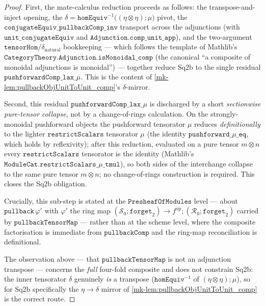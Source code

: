 \begin{proof}
  First, the mate-calculus reduction proceeds as follows: the transpose-and-inject
  opening, the \(\delta = \mathtt{homEquiv}^{-1}\bigl((\eta\otimes\eta)\mathbin{;}\mu\bigr)\)
  pivot, the \(\mathtt{conjugateEquiv\_pullbackComp\_inv}\) transport across the adjunctions
  (with \(\mathtt{unit\_conjugateEquiv}\) and \(\mathtt{Adjunction.comp\_unit\_app}\)), and
  the two-argument \(\mathtt{tensorHom}\)/\(\delta_{\mathrm{natural}}\) bookkeeping --- which
  follows the template of Mathlib's
  \(\mathtt{CategoryTheory.Adjunction.isMonoidal\_comp}\) (the canonical ``a composite of
  monoidal adjunctions is monoidal'') --- together reduce Sq2b to the single residual
  \(\mathtt{pushforwardComp\_lax\_}\mu\). This is the content of
  \ref{mk-lem:pullbackObjUnitToUnit_comp}'s \(\delta\)-mirror.

  Second, this residual \(\mathtt{pushforwardComp\_lax\_}\mu\) is discharged by a short
  \emph{sectionwise pure-tensor collapse}, not by a change-of-rings calculation. On the
  strongly-monoidal pushforward objects the pushforward tensorator \(\mu\) reduces
  \emph{definitionally} to the lighter \(\mathtt{restrictScalars}\) tensorator \(\mu\) (the
  identity \(\mathtt{pushforward\_}\mu\mathtt{\_eq}\), which holds by reflexivity); after
  this reduction, evaluated on a pure tensor \(m \otimes n\) every
  \(\mathtt{restrictScalars}\) tensorator is the identity (Mathlib's
  \(\mathtt{ModuleCat.restrictScalars\_}\mu\mathtt{\_tmul}\)), so both sides of the
  interchange collapse to the same pure tensor \(m \otimes n\); no change-of-rings
  construction is required. This closes the Sq2b obligation.

  Crucially, this sub-step is stated at the \(\mathtt{PresheafOfModules}\) level --- about
  \(\mathtt{pullback}\,\varphi'\) with \(\varphi'\) the ring map
  \((\mathcal{S}_{0}\mathbin{;}\mathtt{forget}_{2}) \to f^{\mathrm{op}}\mathbin{;}
  (\mathcal{R}_{0}\mathbin{;}\mathtt{forget}_{2})\) carried by \(\mathtt{pullbackTensorMap}\)
  --- rather than at the scheme level, where the composite factorisation is immediate from
  \(\mathtt{pullbackComp}\) and the ring-map reconciliation is definitional.

  The observation above --- that \(\mathtt{pullbackTensorMap}\) is not an adjunction
  transpose --- concerns the \emph{full} four-fold composite and does not constrain
  Sq2b: the inner tensorator \(\delta\) genuinely \emph{is} a transpose
  (\(\mathtt{homEquiv}^{-1}\) of \((\eta\otimes\eta)\mathbin{;}\mu\)), so for Sq2b
  specifically the \(\eta\to\delta\) mirror of \ref{mk-lem:pullbackObjUnitToUnit_comp} is the
  correct route.


\end{proof}
